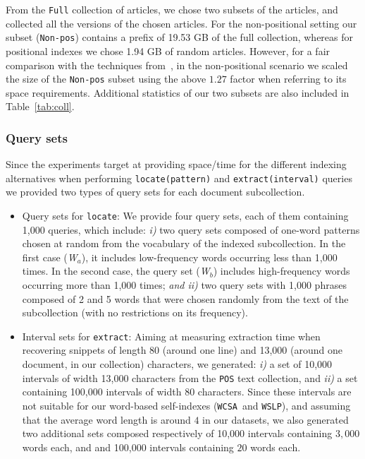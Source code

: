 \documentclass[review]{elsarticle}
\newcommand{\wcsa}{\texttt{WCSA}}
\newcommand{\wslp}{\texttt{WSLP}}
\begin{document}
From the {\tt Full} collection of articles, we chose two subsets of the articles, and collected all the versions of the chosen articles. 
For the non-positional setting our subset (\texttt{Non-pos}) contains a prefix of 19.53 GB of the full collection, whereas for positional indexes we
chose 1.94 GB of random articles. However, for a fair comparison with the techniques from~\cite{HZS10}, in the non-positional scenario we scaled the size
of the \texttt{Non-pos} subset using the above $1.27$ factor when referring to its space requirements. Additional statistics of our two subsets are
also included in Table~\ref{tab:coll}.

%


\subsubsection{Query sets}\label{sec:querysets}

Since the experiments target at providing space/time for the different indexing alternatives 
when performing \texttt{locate(pattern)} and \texttt{extract(interval)} queries we provided two types
of query sets for each document subcollection.

\begin{itemize} 
	\item Query sets for \texttt{locate}: We provide four query sets, each of them containing 1,000 queries, which include:
	{\em i)} two query sets composed of one-word patterns chosen at random from the vocabulary of the indexed subcollection. In the first
	case ({\em W$_a$}), it includes low-frequency words occurring less than 1,000 times. In the second case, the query set ({\em W$_b$}) includes
	high-frequency words occurring more than 1,000 times; {\em and ii)} two query sets with 1,000 phrases composed of 2 and 5 words that
	were chosen randomly from the text of the subcollection (with no restrictions on its frequency).
	
	\item Interval sets for \texttt{extract}: Aiming at measuring extraction time when recovering snippets of length 80 (around one line) and 13,000 (around one document, in our
	collection) characters, we generated: {\em i)} a set of 10,000 intervals of width 13,000 characters from the {\tt POS} text collection, and {\em ii)}  a set containing
	100,000 intervals of width 80 characters. Since these intervals are not suitable for our word-based self-indexes (\wcsa\ and \wslp), and assuming that the average word length 
	is around $4$ in our datasets, we also generated two additional sets composed respectively of 10,000 intervals containing $3,000$ words each, and	
	and 100,000 intervals containing $20$ words each.
\end{itemize}
\end{document}
